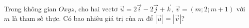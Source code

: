 \begin{ex}
Trong không gian $Oxyz$, cho hai vectơ $\vec u=2\vec i-2\vec j+\vec k$, $\vec v=(m;2;m+1)$ với $m$ là tham số thực. Có bao nhiêu giá trị của $m$ để $|\vec u|=|\vec v|$?
\end{ex}
